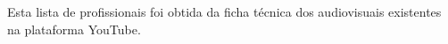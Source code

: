 \documentclass[
12pt,		%
openright,	%
twoside,  %
a4paper,			%
chapter=TITLE,		%
english,			%
french,				%
spanish,			%
brazil				%
]{USPSC-classe/USPSC}
\begin{document}
Esta lista de profissionais foi obtida da ficha t\'ecnica dos audiovisuais existentes na plataforma YouTube.




















\postextual





%
%






\end{document}
